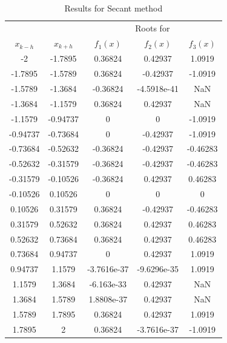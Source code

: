 \documentclass[11pt]{article}
\newcommand{\1}{\mathbbm{1}}
\begin{document}
	\begin{table}[h]
		\small
	\centering
	\begin{tabular}{c c |c c c }
		\hline
		\hline
			&&\multicolumn{3}{c}{Roots for }\\
		     $x_{k-h}$ &    $x_{k+h}$   &   $f_{1}(x)$   &    $f_{2}(x)$   &   $f_{3}(x)$\\
		\hline
		-2 &    -1.7895   &     0.36824  &      0.42937  &    1.0919 \\
		-1.7895 &    -1.5789   &     0.36824  &     -0.42937  &   -1.0919 \\
		-1.5789 &    -1.3684   &    -0.36824  &  -4.5918e-41  &       NaN \\
		-1.3684 &    -1.1579   &     0.36824  &      0.42937  &       NaN \\
		-1.1579 &   -0.94737   &           0  &            0  &   -1.0919 \\
		-0.94737 &   -0.73684   &           0  &     -0.42937  &   -1.0919 \\
		-0.73684 &   -0.52632   &    -0.36824  &     -0.42937  &  -0.46283 \\
		-0.52632 &   -0.31579   &    -0.36824  &     -0.42937  &  -0.46283 \\
		-0.31579 &   -0.10526   &    -0.36824  &      0.42937  &   0.46283 \\
		-0.10526 &    0.10526   &           0  &            0  &         0 \\
		0.10526 &    0.31579   &     0.36824  &     -0.42937  &  -0.46283 \\
		0.31579 &    0.52632   &     0.36824  &      0.42937  &   0.46283 \\
		0.52632 &    0.73684   &     0.36824  &      0.42937  &   0.46283 \\
		0.73684 &    0.94737   &           0  &      0.42937  &    1.0919 \\
		0.94737 &     1.1579   & -3.7616e-37  &  -9.6296e-35  &    1.0919 \\
		1.1579 &     1.3684   &  -6.163e-33  &      0.42937  &       NaN \\
		1.3684 &     1.5789   &  1.8808e-37  &      0.42937  &       NaN \\
		1.5789 &     1.7895   &     0.36824  &      0.42937  &    1.0919 \\
		1.7895 &          2   &     0.36824  &  -3.7616e-37  &   -1.0919 \\
		\hline
		\hline
	\end{tabular} 
	\caption{Results for Secant method}
	\label{tab:3:3}
\end{table}
\end{document}
